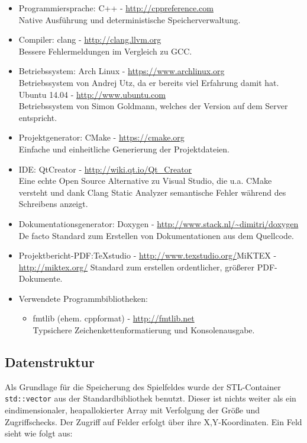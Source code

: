 \documentclass[12pt,a4paper]{article}
\begin{document}
\begin{itemize}
\item Programmiersprache: C++ - \url{http://cppreference.com} \\
Native Ausführung und deterministische Speicherverwaltung.
\item Compiler: clang - \url{http://clang.llvm.org} \\
Bessere Fehlermeldungen im Vergleich zu GCC.
\item Betriebssystem: \newline
Arch Linux - \url{https://www.archlinux.org} \\
Betriebssystem von Andrej Utz, da er bereits viel Erfahrung damit hat. \newline
Ubuntu 14.04 - \url{http://www.ubuntu.com} \\
Betriebssystem von Simon Goldmann, welches der Version auf dem Server entspricht.
\item Projektgenerator: CMake - \url{https://cmake.org} \\
Einfache und einheitliche Generierung der Projektdateien.
\item IDE: QtCreator - \url{http://wiki.qt.io/Qt_Creator} \\
Eine echte Open Source Alternative zu Visual Studio, die u.a. CMake versteht und dank Clang Static Analyzer semantische Fehler während des Schreibens anzeigt.
\item Dokumentationsgenerator: Doxygen - \url{http://www.stack.nl/~dimitri/doxygen} \\
De facto Standard zum Erstellen von Dokumentationen aus dem Quellcode.
\item Projektbericht-PDF:\newline TeXstudio - \url{http://www.texstudio.org/}\newline MiKTEX - \url{http://miktex.org/}\newline
Standard zum erstellen ordentlicher, größerer PDF-Dokumente.
\item Verwendete Programmbibliotheken:
\begin{itemize}
\item fmtlib (ehem. cppformat) - \url{http://fmtlib.net} \\
Typsichere Zeichenkettenformatierung und Konsolenausgabe.
\end{itemize}

\end{itemize}
\newpage

\subsection{Datenstruktur}
Als Grundlage für die Speicherung des Spielfeldes wurde der STL-Container \texttt{std::vector} aus der Standardbibliothek benutzt. Dieser ist nichts weiter als ein eindimensionaler, heapallokierter Array mit Verfolgung der Größe und Zugriffschecks. Der Zugriff auf Felder erfolgt über ihre X,Y-Koordinaten.
Ein Feld sieht wie folgt aus:
\end{document}
